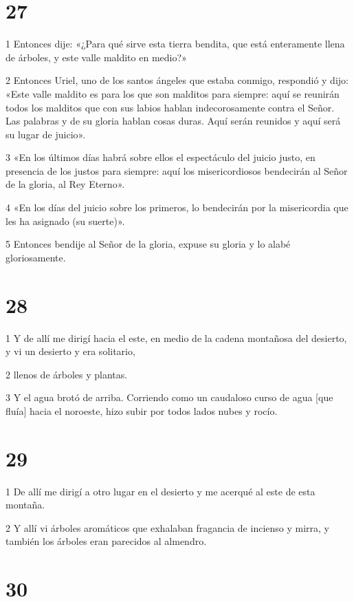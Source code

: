 \chapter{27}

\par 1 Entonces dije: «¿Para qué sirve esta tierra bendita, que está enteramente llena de árboles, y este valle maldito en medio?»
\par 2 Entonces Uriel, uno de los santos ángeles que estaba conmigo, respondió y dijo: «Este valle maldito es para los que son malditos para siempre: aquí se reunirán todos los malditos que con sus labios hablan indecorosamente contra el Señor. Las palabras y de su gloria hablan cosas duras. Aquí serán reunidos y aquí será su lugar de juicio».
\par 3 «En los últimos días habrá sobre ellos el espectáculo del juicio justo, en presencia de los justos para siempre: aquí los misericordiosos bendecirán al Señor de la gloria, al Rey Eterno».
\par 4 «En los días del juicio sobre los primeros, lo bendecirán por la misericordia que les ha asignado (su suerte)».
\par 5 Entonces bendije al Señor de la gloria, expuse su gloria y lo alabé gloriosamente.

\chapter{28}

\par 1 Y de allí me dirigí hacia el este, en medio de la cadena montañosa del desierto, y vi un desierto y era solitario,
\par 2 llenos de árboles y plantas.
\par 3 Y el agua brotó de arriba. Corriendo como un caudaloso curso de agua [que fluía] hacia el noroeste, hizo subir por todos lados nubes y rocío.

\chapter{29}

\par 1 De allí me dirigí a otro lugar en el desierto y me acerqué al este de esta montaña.
\par 2 Y allí vi árboles aromáticos que exhalaban fragancia de incienso y mirra, y también los árboles eran parecidos al almendro.

\chapter{30}

